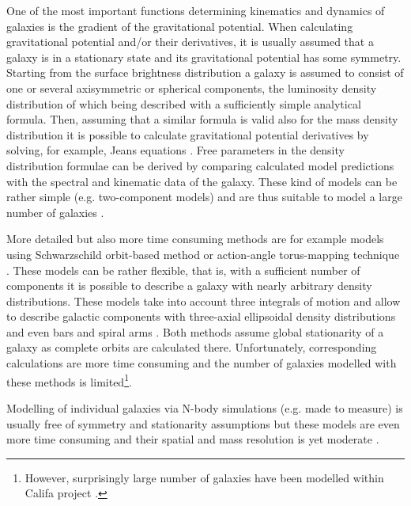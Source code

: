 \documentclass[fleqn,usenatbib]{mnras}
\begin{document}
One of the most important functions determining kinematics and dynamics of galaxies is the gradient of the gravitational potential. When calculating gravitational potential and/or their derivatives, it is usually assumed that a galaxy is in a stationary state and its gravitational potential has some symmetry. Starting from the surface brightness distribution a galaxy is assumed to consist of one or several axisymmetric or spherical components, the luminosity density distribution of which being described with a sufficiently simple analytical formula. Then, assuming that a similar formula is valid also for the mass density distribution it is possible to calculate gravitational potential derivatives by solving, for example, Jeans equations \citep[e.g.][]{Binney:1990, vdMarel:1990, Emsellem:1994, Cappellari:2008}. Free parameters in the density distribution formulae can be derived by comparing calculated model predictions with the spectral and kinematic data of the galaxy. These kind of models can be rather simple (e.g. two-component models) and are thus suitable to model a large number of galaxies \citep[see e.g.][]{Mcgaugh:2016, Kalinova:2017, Barone:2018, Li:2018}. 

More detailed but also more time consuming methods are for example models using Schwarzschild orbit-based method \citep{Schwarzschild:1979,  Thomas:2004, Valluri:2004, Cappellari:2006, Cappellari:2007, vdven:2008, Kowalczyk:2017} or action-angle torus-mapping technique \citep{McGill:1990, Copin:2000, Bovy:2014, Binney:2015, Binney:2016}. These models can be rather flexible, that is, with a sufficient number of components it is possible to describe a galaxy with nearly arbitrary density distributions. These models take into account three integrals of motion and allow to describe galactic components with three-axial ellipsoidal density distributions and even bars and spiral arms \citep{Binney:2018}. Both methods assume global stationarity of a galaxy as complete orbits are calculated there. Unfortunately, corresponding calculations are more time consuming and the number of galaxies modelled with these methods is limited\footnote{However, surprisingly large number of galaxies have been modelled within Califa project \citep{Zhu:2018}.}.

Modelling of individual galaxies via N-body simulations (e.g. made to measure) is usually free of symmetry and stationarity assumptions but these models are even more time consuming and their spatial and mass resolution is yet moderate \citep{Syer:1996, deLorenzi:2007, Long:2010, Zhu:2014}.
\end{document}
